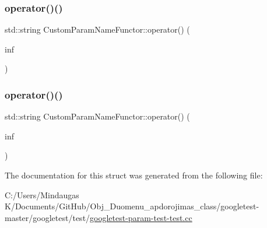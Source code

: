 \mbox{\label{struct_custom_param_name_functor_a364d073efd6cb9a05e9d1c97565288ef}} 
\subsubsection{\texorpdfstring{operator()()}{operator()()}\hspace{0.1cm}{\footnotesize\ttfamily [2/3]}}
{\footnotesize\ttfamily std\+::string Custom\+Param\+Name\+Functor\+::operator() (\begin{DoxyParamCaption}\item[{const \+::\mbox{\hyperlink{structtesting_1_1_test_param_info}{testing\+::\+Test\+Param\+Info}}$<$ std\+::string $>$ \&}]{inf }\end{DoxyParamCaption})\hspace{0.3cm}{\ttfamily [inline]}}

\mbox{\label{struct_custom_param_name_functor_a364d073efd6cb9a05e9d1c97565288ef}} 
\subsubsection{\texorpdfstring{operator()()}{operator()()}\hspace{0.1cm}{\footnotesize\ttfamily [3/3]}}
{\footnotesize\ttfamily std\+::string Custom\+Param\+Name\+Functor\+::operator() (\begin{DoxyParamCaption}\item[{const \+::\mbox{\hyperlink{structtesting_1_1_test_param_info}{testing\+::\+Test\+Param\+Info}}$<$ std\+::string $>$ \&}]{inf }\end{DoxyParamCaption})\hspace{0.3cm}{\ttfamily [inline]}}



The documentation for this struct was generated from the following file\+:\begin{DoxyCompactItemize}
\item 
C\+:/\+Users/\+Mindaugas K/\+Documents/\+Git\+Hub/\+Obj\+\_\+\+Duomenu\+\_\+apdorojimas\+\_\+class/googletest-\/master/googletest/test/\mbox{\hyperlink{googletest-master_2googletest_2test_2googletest-param-test-test_8cc}{googletest-\/param-\/test-\/test.\+cc}}\end{DoxyCompactItemize}
